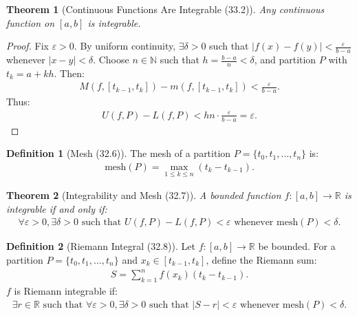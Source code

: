 \documentclass[7pt]{article}
\theoremstyle{definition}
\newtheorem{definition}{Definition}
\theoremstyle{plain}
\newtheorem{theorem}{Theorem}
\begin{document}
\begin{theorem}[Continuous Functions Are Integrable (33.2)]
Any continuous function on $ [a, b] $ is integrable.
\end{theorem}

\begin{proof}
Fix $ \varepsilon > 0 $. By uniform continuity, $ \exists \delta > 0 $ such that $ |f(x) - f(y)| < \frac{\varepsilon}{b-a} $ whenever $ |x - y| < \delta $. Choose $ n \in \mathbb{N} $ such that $ h = \frac{b-a}{n} < \delta $, and partition $ P $ with $ t_k = a + kh $. Then:
\begin{align}
M(f, [t_{k-1}, t_k]) - m(f, [t_{k-1}, t_k]) < \frac{\varepsilon}{b-a}.
\end{align}
Thus:
\begin{align}
U(f, P) - L(f, P) < hn \cdot \frac{\varepsilon}{b-a} = \varepsilon.
\end{align}
\end{proof}

\begin{definition}[Mesh (32.6)]
The mesh of a partition $ P = \{t_0, t_1, \ldots, t_n\} $ is:
\begin{align}
\text{mesh}(P) = \max_{1 \leq k \leq n} (t_k - t_{k-1}).
\end{align}
\end{definition}

\begin{theorem}[Integrability and Mesh (32.7)]
A bounded function $ f : [a, b] \to \mathbb{R} $ is integrable if and only if:
\begin{align}
\forall \varepsilon > 0, \exists \delta > 0 \text{ such that } U(f, P) - L(f, P) < \varepsilon \text{ whenever mesh}(P) < \delta.
\end{align}
\end{theorem}

\begin{definition}[Riemann Integral (32.8)]
Let $ f : [a, b] \to \mathbb{R} $ be bounded. For a partition $ P = \{t_0, t_1, \ldots, t_n\} $ and $ x_k \in [t_{k-1}, t_k] $, define the Riemann sum:
\begin{align}
S = \sum_{k=1}^n f(x_k)(t_k - t_{k-1}).
\end{align}
$ f $ is Riemann integrable if:
\begin{align}
\exists r \in \mathbb{R} \text{ such that } \forall \varepsilon > 0, \exists \delta > 0 \text{ such that } |S - r| < \varepsilon \text{ whenever mesh}(P) < \delta.
\end{align}
\end{definition}
\end{document}
